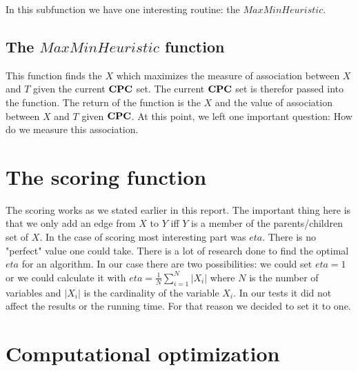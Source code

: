 			 \label{img.mmpcBar}

			In this subfunction we have one interesting routine: the $MaxMinHeuristic$.

			\subsection{The $MaxMinHeuristic$ function}

				This function finds the $X$ which maximizes the measure of association between $X$ and $T$ given the current ${\textbf{CPC}}$ set. The current ${\textbf{CPC}}$ set is therefor passed into the function. The return of the function is the $X$ and the value of association between $X$ and $T$ given ${\textbf{CPC}}$. At this point, we left one important question: How do we measure this association.

		\section{The scoring function}

			The scoring works as we stated earlier in this report. The important thing here is that we only add an edge from $X$ to $Y$ iff $Y$ is a member of the parents/children set of $X$. In the case of scoring most interesting part was $eta$. There is no "perfect" value one could take. There is a lot of research done to find the optimal $eta$ for an algorithm. In our case there are two possibilities: we could set $eta = 1$ or we could calculate it with $eta = \frac{1}{N} \sum_{i = 1}^{N} |X_{i}|$ where $N$ is the number of variables and $|X_{i}|$ is the cardinality of the variable $X_{i}$. In our tests it did not affect the results or the running time. For that reason we decided to set it to one.
			

	\section{Computational optimization}

